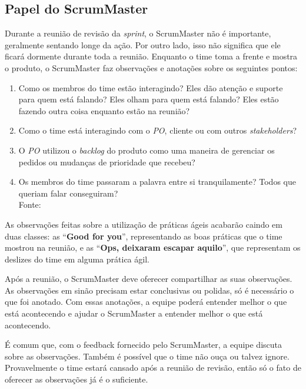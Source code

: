 \documentclass{iiufrgs}
\newcommand{\fonte}[1]{\\Fonte: {#1}}
\begin{document}
\subsection{Papel do ScrumMaster}

Durante a reunião de revisão da \textit{sprint}, o ScrumMaster não é importante, geralmente sentando longe da ação. Por outro lado, isso não significa que ele ficará dormente durante toda a reunião. Enquanto o time toma a frente e mostra o produto, o ScrumMaster faz observações e anotações sobre os seguintes pontos:

\begin{enumerate}[leftmargin=3em, noitemsep, nosep, before=\vspace{1cm}, after=\vspace{1cm}]
    \setlength{\itemindent}{1em}
    \item Como os membros do time estão interagindo? Eles dão atenção e suporte para quem está falando? Eles olham para quem está falando? Eles estão fazendo outra coisa enquanto estão na reunião?
    \item Como o time está interagindo com o \textit{PO}, cliente ou com outros \textit{stakeholders}?
    \item O \textit{PO} utilizou o \textit{backlog} do produto como uma maneira de gerenciar os pedidos ou mudanças de prioridade que recebeu?
    \item Os membros do time passaram a palavra entre si tranquilamente? Todos que queriam falar conseguiram?
    \fonte{\cite{Adkins2010Coaching}}
\end{enumerate}

As observações feitas sobre a utilização de práticas ágeis acabarão caindo em duas classes: as \enquote{\textbf{Good for you}}, representando as boas práticas que o time mostrou na reunião, e as \enquote{\textbf{Ops, deixaram escapar aquilo}}, que representam os deslizes do time em alguma prática ágil.

Após a reunião, o ScrumMaster deve oferecer compartilhar as suas observações. As observações em sinão precisam estar conclusivas ou polidas, só é necessário o que foi anotado. Com essas anotações, a equipe poderá entender melhor o que está acontecendo e ajudar o ScrumMaster a entender melhor o que está acontecendo.

É comum que, com o feedback fornecido pelo ScrumMaster, a equipe discuta sobre as observações. Também é possível que o time não ouça ou talvez ignore. Provavelmente o time estará cansado após a reunião de revisão, então só o fato de oferecer as observações já é o suficiente.
\end{document}

